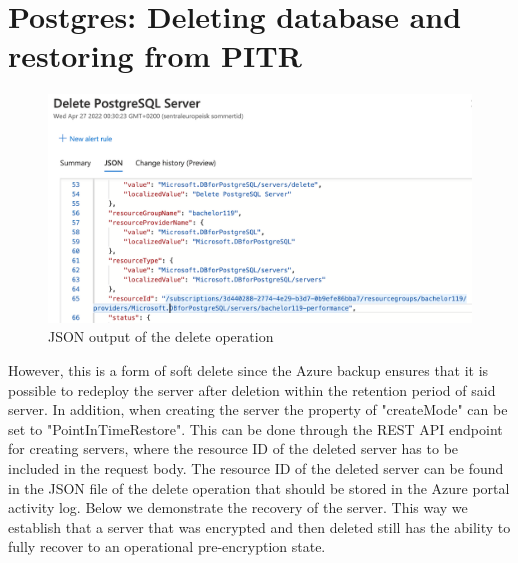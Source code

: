 \section{Postgres: Deleting database and restoring from PITR}
\label{app_pg_s2e1}



\begin{figure}[H]
    \centering
    \includegraphics[width=\textwidth]{figures/postgres/delete_server.png}
    \caption{JSON output of the delete operation}
    \label{fig:my_label}
\end{figure}

However, this is a form of soft delete since the Azure backup ensures that it is possible to redeploy the server after deletion within the retention period of said server.
In addition, when creating the server the property of "createMode" can be set to "PointInTimeRestore". This can be done through the REST API endpoint for creating servers, where the resource ID of the deleted server has to be included in the request body. 
The resource ID of the deleted server can be found in the JSON file of the delete operation that should be stored in the Azure portal activity log. Below we demonstrate the recovery of the server. 
This way we establish that a server that was encrypted and then deleted still has the ability to fully recover to an operational pre-encryption state.


